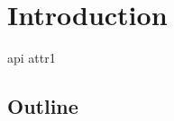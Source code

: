 \chapter{Introduction}
\label{ch:introduction}
\glsresetall %
\lipsum[1-5] \citep{Rabin1981} \citet{Rabin1981} \gls{api} \gls{attr1}


\section{Outline}
\lipsum[1]




